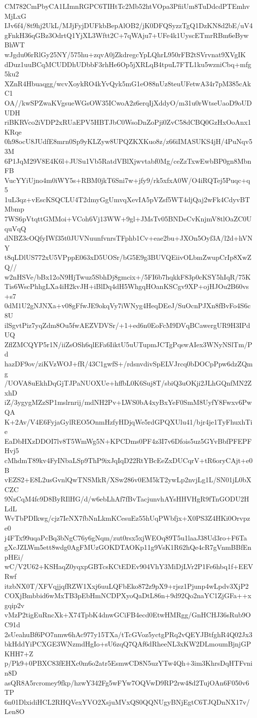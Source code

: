 CM782CmPbyCA1LImnRGPC6TIHtTc2Mb52htVOpa3PfiiUm8TuDdcdPTEmhvMjLxG
IJv6f4/8t9hj2UkL/MJjFyjDUFkbBepAlOB2/jK0DFQSyzzTgQ1DzKN8d2bE/uV4
gFnkH36qGBz3OdrtQ1YjXL3Wftt2C+7qWAju7+UFe4k1UyscETmrRBm6eBywBhWT
wJgdu06rRlGy25NY/575hu+zqvA0jZkdregcYpLQhrL950rFB2tSVrvnat9XVgIK
dDuz1uuBCqMCUDDhUDbbF3rhHe6Op5jXRLqB4tpuL7FTL1ku5wzniCbq+mfg5ku2
XZnR4Hbuaqgg/wcvXoykRO4kYvQyk5mG1eO88nUz8teuUFetwA34r7pM385cAkC1
OA//kwSPZwaKVgsueWGsOW35ICwoA2z6erqIjXddyO/m31u0rWtseUaoD9oUDUDH
riBKRVco2iVDP2xRUaEPV5HBTJbC0WsoDnZoPji0ZvC58dCBQ0GzHxOoAnx1KRqe
0h98ocU8JUdfE8mrn0Sp9yKLZyw8UPQZKXKuo8z/z66iIMASUKS4jH/4PuNqv53M
6P1JqM29V8E4K6l+JUSu1Vb5RatdVBlXjwvtabf0Mg/ceZzTxwEwbBP0gn8MbnFB
VucYYiUjno4m0iWY5s+RBM0jkT6Sni7w+jfy9/rk5xfxA0W/O4iRQTej5Puqc+q5
1uL3qz+vEscKSQCLU4T2dmyGgUmvqXevIA5pVZsf5WT4djQaj2wFk4CdyvBTMbmp
7WS6pVtqttGMMoi+VCoh6Vj13WW+9gl+JMsTv05BNDeCvKnjmV8tlOaZC0UquVqQ
dNBZ3cOQfyIWf35t0JUVNuunfvnrsTFphb1Cv+eae2bu+JXOn5Oyf3A/l2d+hVNY
t8qLDlUS772xU5VPppE063xD5UOSr/bG5E9g3BUVQEiivOLbmZwupCrIp8XwZQ//
w2nHSVe/bBx12oN9HjTwuz5SbhDj8gmcix+/5FI6b7hqkkF83p0cKSY5hIqR/75K
Tis6WscPhhgLXa4iH2kvJH+iBlDq4dH5WhgqHOanKSCgv9XP+ojHJOu2B60vs+s7
0dM1U2gNJNXa+v08gFfwJE9okqVy7iWNyg4HeqDEeJ/SuOcnPJXn8fBvFo4S6c8U
ilSgvtPiz7yqZdm8Ou5fwAEZVDVSr/+1+ed6n0EoFcM9DVqBCawergUR9H3IPdUQ
ZflZMCQYP5r1N/iiZsOSh6qlEFa6IiktU5uUTupmJCTgPqswAIex3WNyNSlTm/Pd
hazDF9ov/ziKVzWOJ+fR/43C1gwfS+/rdsnvdivSpELVJrcq0bDOCpPpw6dzZQmg
/UOVA8uEkhDqGjTJPaNUOXUe+hffbL0K6Suj8T/sbiQ3uOKji2JLhGQnfMN2ZxhD
iZ/3ygygMZzSP1mslrnrij/mdNH2Pv+LWS0bA4xyBxYeF0SmM8UyfY8Fwxv6PwQA
K+2Av/V4E6FyjaGylREO5OnmHzfyHDjqWe5rdGPQXUlu41/bjr4je1TyFhuxhTie
EaDbHXzDDOI7lv8T5WmWg5N+KPCDms0PF4z3I7v6Dfois5uz5GYvBbfPFEPFHvj5
cMhdmT89kv4FyINbaLSp9ThP9ixJqIqD22RtYBcEeZxDUCqrV+tR6oryCAjt+e0B
vEZS2+E8L2usGvnlQwTNSMkR/XSw286v0EM5kT2ywLp2nvjLg1L/SN01jL0bXCZC
9NzCqM4fc9D8ByRIlHG/d/w6ebLhAf7fBvTacjunvhAYsHHVHgR9fTnGODU2HLdL
WvTbPDIkwg/cjz7IeNX7fbNnLkmKCesuEz55hUqPWbfjx+X0PS3Z4HKi0Orvpze0
j4FTx99uqaPcBq3bNgC76y6gNqm/zut0rsx5xjWEOq89T5u1laaJ38Ud3ro+F6Ta
gXcJZLWm5ett8wdg0AgFMUzGOKDTAOKp11g9VsK1R62hQe4cR7gVnmBBfEnpHEi/
wC/V2U62+KSHaqZ0yqxpGBTcsKCtEDEv904VhY3MiDjLVr2P1Fe6hbq1f+EEVRwf
itzbNX0T/XFVqjjqfRZW1Xxj6uuLQFbEko872z9pX9+rjsz1Pjunp4wLpdv3XjP2
COXjBmbbid6wMxTB3pEbHmNCDPXyoQaDtL86n+9d92Qo2naYC1ZjGFa++xgqip2v
vMzP2tigEuRncXk+X74TpbK4dnwGCiFB4ecd0EtwHMRgg/GnHCHJ36sRub9OC91d
2sUeahuBf6PO7nmw6hAc977y15TXa/tTcGVoz5yctgPRq2vQEYJBtfghR4Q02Jx3
bkHddYiPCXGE3WNzmdHgIo+sU6zqQ7QAf6dRheeNL3xKW2DLmoumBjnjGPKHH7+Z
p/Pk9+0PBXC83fEHXc0m6o2atr5EsmwCD8N5uzYTw4Qh+3im3KhrsDqHTFvnin8D
asQR8A5rcromey9fkp/hzwY342Fg5wFYw7OQVwD9RP2rw48d2TujOAn6F050v6TP
6n01DlxidiHCL2RHQVexYVO2XsjuMVxQS0QQNUgyBNjEgtC6TJQDnNX17v/Len8O
